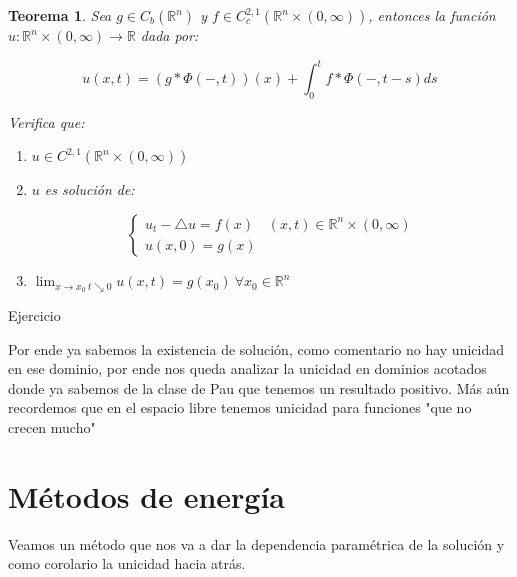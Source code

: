 \documentclass[11pt]{article}
\newcommand{\R}{{\mathbb{R}}}
\newtheorem{theorem}{Teorema}[section]
\newenvironment{proof}[1][Demostraci\'on]{\begin{trivlist}
\item[\hskip \labelsep {\bfseries #1}]}{\end{trivlist}}
\begin{document}
\begin{theorem}

Sea $g \in C_b(\R^n)$ y $f \in C^{2,1}_{c}(\R^n \times (0,\infty))$, entonces la funci\'on $u:\R^n \times (0, \infty) \rightarrow \R$ dada por:

$$u(x,t) = (g \ast \Phi(-,t))(x) + \int_{0}^{t}{f \ast \Phi(-,t-s) ds}$$

Verifica que:

\begin{enumerate}
\item $u \in C^{2,1}(\R^n \times (0, \infty))$
\item $u$ es soluci\'on de:


\begin{equation}
\label{Calor completo}
{
	\left\{
		\begin{array}{ll}
			u_t -  \triangle u = f(x) & (x,t) \in \R^n \times (0,\infty) \\
			u(x,0)= g(x) & 
		\end{array}
	\right.
}
\end{equation}

\item $\lim_{x \rightarrow x_0 \ t \searrow 0}{u(x,t)}=g(x_0) \ \forall x_0 \in \R^n$

\end{enumerate}

\end{theorem}

\begin{proof}
Ejercicio
\end{proof}


Por ende ya sabemos la existencia de soluci\'on, como comentario no hay unicidad en ese dominio, por ende nos queda analizar la unicidad en dominios acotados donde ya sabemos de la clase de Pau que tenemos un resultado positivo. M\'as a\'un recordemos que en el espacio libre tenemos unicidad para funciones "que no crecen mucho"

\section{M\'etodos de energ\'ia}

Veamos un m\'etodo que nos va a dar la dependencia param\'etrica de la soluci\'on y como corolario la unicidad hacia atr\'as.
\end{document}

